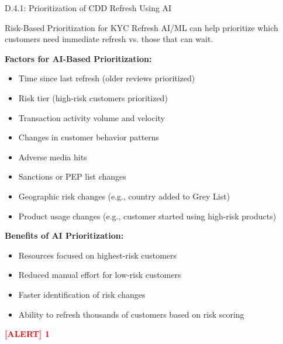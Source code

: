 \documentclass[11pt,a4paper]{beamer}
\newcommand{\redflag}[1]{\textcolor{red}{\textbf{[ALERT] 1}}}
\begin{document}
\begin{frame}{D.4.1: Prioritization of CDD Refresh Using AI}
	\begin{block}{Risk-Based Prioritization for KYC Refresh}
		AI/ML can help prioritize which customers need immediate refresh vs. those that can wait.
	\end{block}
	\textbf{Factors for AI-Based Prioritization:}
	\begin{itemize}
		\item Time since last refresh (older reviews prioritized)
		\item Risk tier (high-risk customers prioritized)
		\item Transaction activity volume and velocity
		\item Changes in customer behavior patterns
		\item Adverse media hits
		\item Sanctions or PEP list changes
		\item Geographic risk changes (e.g., country added to Grey List)
		\item Product usage changes (e.g., customer started using high-risk products)
	\end{itemize}
	\textbf{Benefits of AI Prioritization:}
	\begin{itemize}
		\item Resources focused on highest-risk customers
		\item Reduced manual effort for low-risk customers
		\item Faster identification of risk changes
		\item Ability to refresh thousands of customers based on risk scoring
	\end{itemize}
	\redflag{Prioritization must be documented and defensible to regulators.}
\end{frame}

\end{document}
